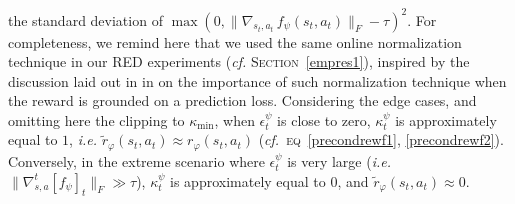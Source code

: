 the standard deviation of
$\max (0, \lVert \nabla_{s_t,a_t} \, f_\psi (s_t,a_t) \rVert _F - \tau)^2$.
For completeness, we remind here that we used the same online normalization technique
in our RED experiments
(\textit{cf.} \textsc{Section}~\ref{empres1}),
inspired by the discussion laid out in in \cite{Burda2018-vl}
on the importance of such normalization technique
when the reward is grounded on a prediction loss.
Considering the edge cases, and omitting here the clipping to $\kappa_\text{min}$,
when $\epsilon_t^\psi$ is close to zero,
$\kappa_t^\psi$ is approximately equal to $1$,
\textit{i.e.} $\tilde{r}_\varphi (s_t,a_t) \approx r_\varphi (s_t,a_t)$
(\textit{cf.}~\textsc{eq}~\ref{precondrewf1}, \ref{precondrewf2}).
Conversely, in the extreme scenario where $\epsilon_t^\psi$ is very large
(\textit{i.e.}~$\lVert\nabla_{s,a}^t[f_\psi]_t\rVert _F \gg \tau$),
$\kappa_t^\psi$ is approximately equal to $0$,
and $\tilde{r}_\varphi (s_t,a_t) \approx 0$.

